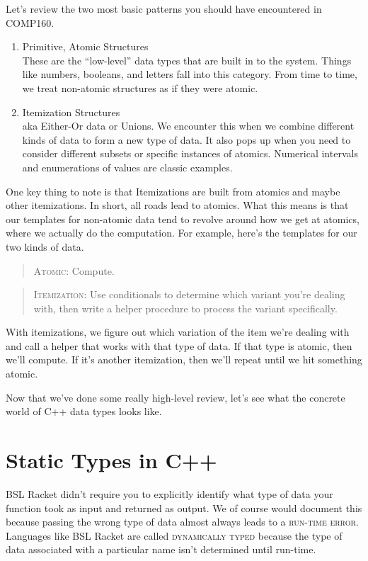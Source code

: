 \documentclass[]{tufte-handout}
\begin{document}
Let's review the two most basic patterns you should have encountered in COMP160.
\begin{enumerate}
\item Primitive, Atomic Structures \\
These are the ``low-level'' data types that are built in to the system.  Things like numbers, booleans, and letters fall into this category.  From time to time, we treat non-atomic structures as if they were atomic.
\item Itemization Structures \\
aka Either-Or data or Unions.  We encounter this when we combine different kinds of data to form a new type of data. It also pops up when you need to consider different subsets or specific instances of atomics. Numerical intervals and enumerations of values are classic examples. 
\end{enumerate}
One key thing to note is that Itemizations are built from atomics and maybe other itemizations. In short, all roads lead to atomics. What this means is that our templates for non-atomic data tend to revolve around how we get at atomics, where we actually do the computation. For example, here's the templates for our two kinds of data.
\begin{quote}
\textsc{Atomic}: Compute. 
\end{quote}
\begin{quote}
\textsc{Itemization}: Use conditionals to determine which variant you're dealing with, then write a helper procedure to process the variant specifically.
\end{quote}
With itemizations, we figure out which variation of the item we're dealing with and call a helper that works with that type of data.  If that type is atomic, then we'll compute. If it's another itemization, then we'll repeat until we hit something atomic.  

Now that we've done some really high-level review, let's see what the concrete world of C++ data types looks like.

\section{Static Types in C++}

BSL Racket didn't require you to explicitly identify what type of data your function took as input and returned as output.  We of course would document this because passing the wrong type of data almost always leads to a \textsc{run-time error}. Languages like BSL Racket are called \textsc{dynamically typed} because the type of data associated with a particular name isn't determined until run-time.  
\end{document}
